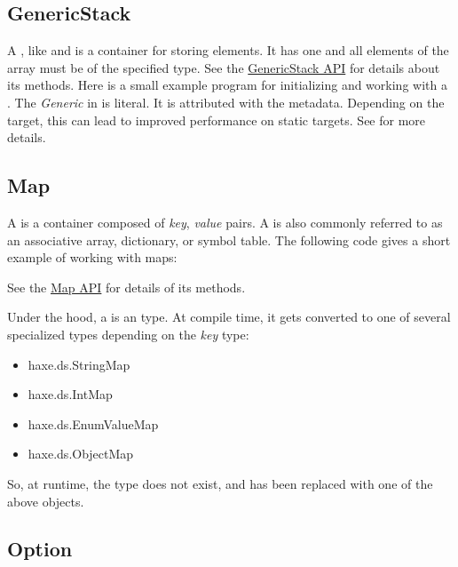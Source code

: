 \subsection{GenericStack}
\label{std-GenericStack}
A , like  and  is a container for storing elements.  It has one  and all elements of the array must be of the specified type. See the \href{http://api.haxe.org/haxe/ds/GenericStack.html}{GenericStack API} for details about its methods.  Here is a small example program for initializing and working with a .
The \emph{Generic} in  is literal.  It is attributed with the  metadata.  Depending on the target, this can lead to improved performance on static targets.  See  for more details.
\subsection{Map}
\label{std-Map}

A  is a container composed of \emph{key}, \emph{value} pairs.  A  is also commonly referred to as an associative array, dictionary, or symbol table.  The following code gives a short example of working with maps:


See the \href{http://api.haxe.org/Map.html}{Map API} for details of its methods.

Under the hood, a  is an  type.  At compile time, it gets converted to one of several specialized types depending on the \emph{key} type:
\begin{itemize}
	\item haxe.ds.StringMap
	\item haxe.ds.IntMap
	\item haxe.ds.EnumValueMap
	\item haxe.ds.ObjectMap
\end{itemize}
So, at runtime, the  type does not exist, and has been replaced with one of the above objects.  

\subsection{Option}
\label{std-Option}

